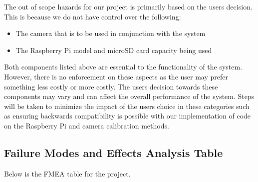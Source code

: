 \documentclass{article}
\begin{document}
The out of scope hazards for our project is primarily based on the user\textquotesingle s decision. This is because we do not have control over the following:\\
\begin{itemize}
    \item The camera that is to be used in conjunction with the system
    \item The Raspberry Pi model and microSD card capacity being used
\end{itemize}

Both components listed above are essential to the functionality of the system. However, there is no enforcement on these aspects as the user may prefer something 
less costly or more costly. The user\textquotesingle s decision towards these components may vary and can affect the overall performance of the system. Steps will be taken to minimize 
the impact of the user\textquotesingle s choice in these categories such as ensuring backwards compatibility is possible with our implementation of code on the Raspberry Pi and camera 
calibration methods.\\

\subsection{Failure Modes and Effects Analysis Table}

Below is the FMEA table for the project.
\end{document}
